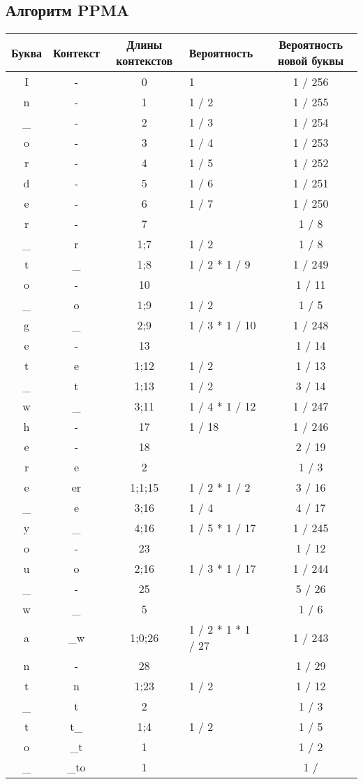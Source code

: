 \subsection{Алгоритм PPMA}
\begin{center}
    \begin{longtable}{|c|c|c|p{3cm}|c|}
    \hline
    Буква&Контекст&Длины контекстов&Вероятность&Вероятность новой буквы\\    
    \hline I&-&0&1&1 / 256\\  \hline n&-&1&1 / 2&1 / 255\\  \hline \_&-&2&1 / 3&1 / 254\\  \hline o&-&3&1 / 4&1 / 253\\  \hline r&-&4&1 / 5&1 / 252\\  \hline d&-&5&1 / 6&1 / 251\\  \hline e&-&6&1 / 7&1 / 250\\  \hline r&-&7&&1 / 8\\  \hline \_&r&1;7&1 / 2&1 / 8\\  \hline t&\_&1;8&1 / 2 * 1 / 9&1 / 249\\  \hline o&-&10&&1 / 11\\  \hline \_&o&1;9&1 / 2&1 / 5\\  \hline g&\_&2;9&1 / 3 * 1 / 10&1 / 248\\  \hline e&-&13&&1 / 14\\  \hline t&e&1;12&1 / 2&1 / 13\\  \hline \_&t&1;13&1 / 2&3 / 14\\  \hline w&\_&3;11&1 / 4 * 1 / 12&1 / 247\\  \hline h&-&17&1 / 18&1 / 246\\  \hline e&-&18&&2 / 19\\  \hline r&e&2&&1 / 3\\  \hline e&er&1;1;15&1 / 2 * 1 / 2&3 / 16\\  \hline \_&e&3;16&1 / 4&4 / 17\\  \hline y&\_&4;16&1 / 5 * 1 / 17&1 / 245\\  \hline o&-&23&&1 / 12\\  \hline u&o&2;16&1 / 3 * 1 / 17&1 / 244\\  \hline \_&-&25&&5 / 26\\  \hline w&\_&5&&1 / 6\\  \hline a&\_w&1;0;26&1 / 2 * 1 * 1 / 27&1 / 243\\  \hline n&-&28&&1 / 29\\  \hline t&n&1;23&1 / 2&1 / 12\\  \hline \_&t&2&&1 / 3\\  \hline t&t\_&1;4&1 / 2&1 / 5\\  \hline o&\_t&1&&1 / 2\\  \hline \_&\_to&1&&1 / 
\end{longtable}
\end{center}
